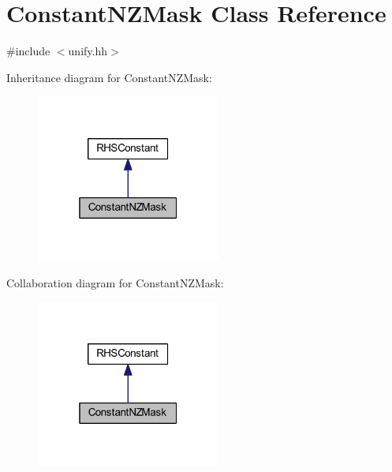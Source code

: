 \hypertarget{class_constant_n_z_mask}{}\section{Constant\+N\+Z\+Mask Class Reference}
\label{class_constant_n_z_mask}


{\ttfamily \#include $<$unify.\+hh$>$}



Inheritance diagram for Constant\+N\+Z\+Mask\+:
\nopagebreak
\begin{figure}[H]
\begin{center}
\leavevmode
\includegraphics[width=172pt]{class_constant_n_z_mask__inherit__graph}
\end{center}
\end{figure}


Collaboration diagram for Constant\+N\+Z\+Mask\+:
\nopagebreak
\begin{figure}[H]
\begin{center}
\leavevmode
\includegraphics[width=172pt]{class_constant_n_z_mask__coll__graph}
\end{center}
\end{figure}
